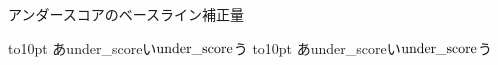 \documentclass{jarticle}
\begin{document}
アンダースコアのベースライン補正量\par
\vbox to10pt{\yoko\adjustbaseline
あunder\_scoreい$\hbox{under\_score}$う\vfill}
\vbox to10pt{\tate\adjustbaseline
あunder\_scoreい$\hbox{under\_score}$う\vfill} %
\end{document}
